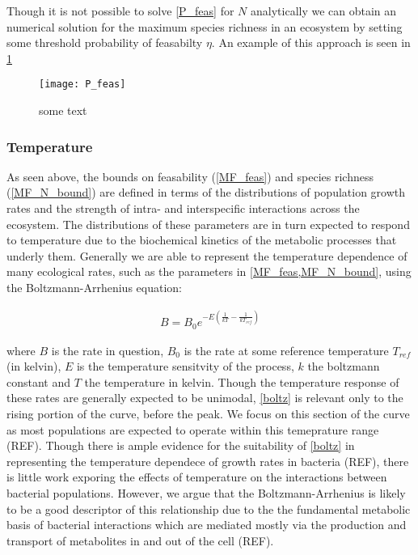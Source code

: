 \documentclass{article}
\begin{document}
Though it is not possible to solve \cref{P_feas} for $N$ analytically we can obtain an numerical solution for the maximum species richness in an ecosystem by setting some threshold probability of feasabilty $\eta$. An example of this approach is seen in \cref{P_feas_fig}

\begin{figure}
  \texttt{[image: P\_feas]}
  \centering
  \caption{some text}
  \label{P_feas_fig}
\end{figure}


\subsubsection{Temperature}
As seen above, the bounds on feasability (\cref{MF_feas}) and species richness (\cref{MF_N_bound}) are defined in terms of the distributions of population growth rates and the strength of intra- and interspecific interactions across the ecosystem. The distributions of these parameters are in turn expected to respond to temperature due to the biochemical kinetics of the metabolic processes that underly them. Generally we are able to represent the temperature dependence of many ecological rates, such as the parameters in \cref{MF_feas,MF_N_bound}, using the Boltzmann-Arrhenius equation:

\begin{align}
  B = B_0 e^{-E \left(\frac{1}{k T} - \frac{1}{k T_{ref}} \right) }   \label{boltz}
\end{align}

where $B$ is the rate in question, $B_0$ is the rate at some reference temperature $T_{ref}$ (in kelvin), $E$ is the temperature sensitvity of the process, $k$ the boltzmann constant and $T$ the temperature in kelvin. Though the temperature response of these rates are generally expected to be unimodal, \cref{boltz} is relevant only to the rising portion of the curve, before the peak. We focus on this section of the curve as most populations are expected to operate within this temeprature range (REF). Though there is ample evidence for the suitability of \cref{boltz} in representing the temperature dependece of growth rates in bacteria (REF), there is little work exporing the effects of temperature on the interactions between bacterial populations. However, we argue that the Boltzmann-Arrhenius is likely to be a good descriptor of this relationship due to the the fundamental metabolic basis of bacterial interactions which are mediated mostly via the production and transport of metabolites in and out of the cell (REF).
\end{document}
